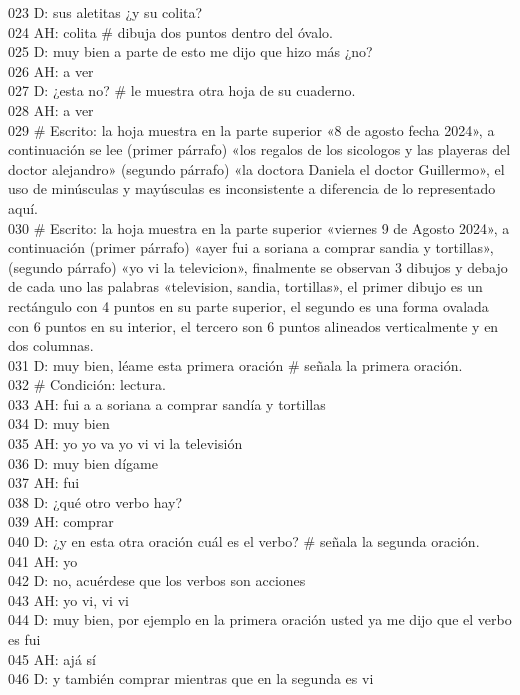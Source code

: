 023 D: sus aletitas ¿y su colita?\\
024 AH: colita \# dibuja dos puntos dentro del óvalo.\\
025 D: muy bien a parte de esto me dijo que hizo más ¿no?\\
026 AH: a ver\\
027 D: ¿esta no? \# le muestra otra hoja de su cuaderno.\\
028 AH: a ver\\
029 \# Escrito: la hoja muestra en la parte superior «8 de agosto fecha 2024», a continuación se lee (primer párrafo) «los regalos de los sicologos y las playeras del doctor alejandro» (segundo párrafo) «la doctora Daniela el doctor Guillermo», el uso de minúsculas y mayúsculas es inconsistente a diferencia de lo representado aquí.\\
030 \# Escrito: la hoja muestra en la parte superior «viernes 9  de Agosto 2024», a continuación (primer párrafo) «ayer fui a soriana a comprar sandia y tortillas», (segundo párrafo) «yo vi la televicion», finalmente se observan 3 dibujos y debajo de cada uno las palabras «television, sandia, tortillas», el primer dibujo es un rectángulo con 4 puntos en su parte superior, el segundo es una forma ovalada con 6 puntos en su interior, el tercero son 6 puntos alineados verticalmente y en dos columnas.\\
031 D: muy bien, léame esta primera oración \# señala la primera oración.\\
032 \# Condición: lectura.\\
033 AH: fui a a soriana a comprar sandía y tortillas\\
034 D: muy bien\\
035 AH: yo yo va yo vi vi la televisión\\
036 D: muy bien dígame\\
037 AH: fui\\
038 D: ¿qué otro verbo hay?\\
039 AH: comprar\\
040 D: ¿y en esta otra oración cuál es el verbo? \# señala la segunda oración.\\
041 AH: yo\\
042 D: no, acuérdese que los verbos son acciones\\
043 AH: yo vi, vi vi\\
044 D: muy bien, por ejemplo en la primera oración usted ya me dijo que el verbo es fui\\
045 AH: ajá sí\\
046 D: y también comprar mientras que en la segunda es vi\\
